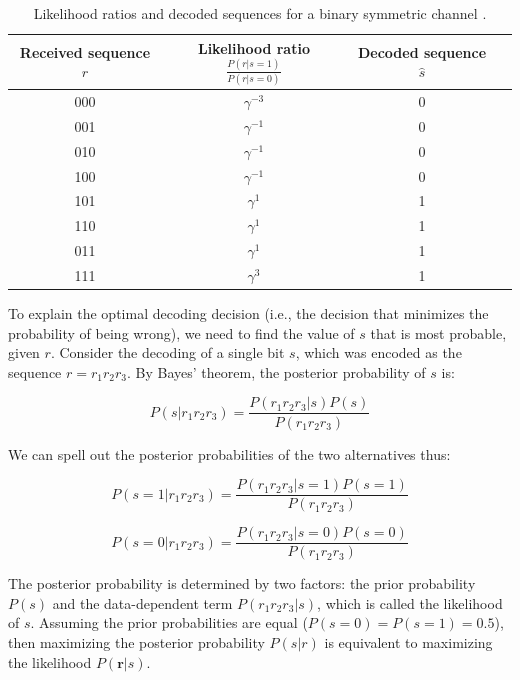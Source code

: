 \documentclass[a4paper,10pt]{article}
\newcommand{\hlt}[1]{\colorbox{color3}{#1}}
\begin{document}
\begin{table}[h!]
    \centering
    \begin{tabular}{cccc}
        \hline
        Received sequence $r$ & Likelihood ratio $\frac{P(r|s=1)}{P(r|s=0)}$ & Decoded sequence $\hat{s}$ \\
        \hline
        000 & $\gamma^{-3}$ & 0 \\
        001 & $\gamma^{-1}$ & 0 \\
        010 & $\gamma^{-1}$ & 0 \\
        100 & $\gamma^{-1}$ & 0 \\
        101 & $\gamma^{1}$ & 1 \\
        110 & $\gamma^{1}$ & 1 \\
        011 & $\gamma^{1}$ & 1 \\
        111 & $\gamma^{3}$ & 1 \\
        \hline
    \end{tabular}
    \caption{Likelihood ratios and decoded sequences for a binary symmetric channel \cite{mackay_book}.}
    \label{tab:likelihood_decoding}
\end{table}

To explain the \hlt{optimal decoding decision} (i.e., the decision that minimizes the probability of being wrong), we need to find the value of $s$ that is most probable, given $r$.  Consider the decoding of a single bit $s$, which was encoded as the sequence $r = r_1 r_2 r_3$. By Bayes' theorem, the posterior probability of $s$ is:

\begin{equation}
P(s|r_1 r_2 r_3) = \frac{P(r_1 r_2 r_3|s) P(s)}{P(r_1 r_2 r_3)}
\end{equation}

We can spell out the posterior probabilities of the two alternatives thus:

\begin{equation}
P(s=1|r_1 r_2 r_3) = \frac{P(r_1 r_2 r_3|s=1) P(s=1)}{P(r_1 r_2 r_3)}
\end{equation}

\begin{equation}
P(s=0|r_1 r_2 r_3) = \frac{P(r_1 r_2 r_3|s=0) P(s=0)}{P(r_1 r_2 r_3)}
\end{equation}

The posterior probability is determined by two factors: the \hlt{prior} probability $P(s)$ and the \hlt{data-dependent} term $P(r_1 r_2 r_3|s)$, which is called the \hlt{likelihood} of $s$. Assuming the prior probabilities are equal ($P(s=0) = P(s=1) = 0.5$), then maximizing the posterior probability $P(s|r)$ is equivalent to \hlt{maximizing} the likelihood $P(\bm{r}|s)$. 
\end{document}

